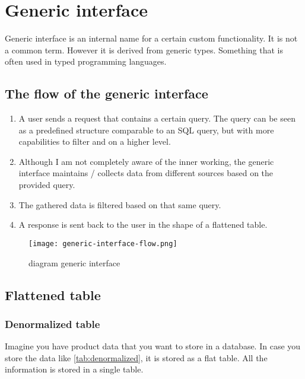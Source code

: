 \chapter{Generic interface}\label{app:generic-interface}

Generic interface is an internal name for a certain custom functionality. It is not a common term. However it is derived from generic types. Something that is often used in typed programming languages.

\section{The flow of the generic interface}
    \begin{enumerate}
        \setlength\itemsep{-2pt} 
        \item{A user sends a request that contains a certain query. The query can be seen as a predefined structure comparable to an SQL query, but with more capabilities to filter and on a higher level.}
        \item{Although I am not completely aware of the inner working, the generic interface maintains / collects data from different sources based on the provided query.}
        \item{The gathered data is filtered based on that same query.}
        \item{A response is sent back to the user in the shape of a flattened table.}
    \end{enumerate}  
     \begin{figure}[H]
        \centering
        \texttt{[image: generic-interface-flow.png]}
        \caption{diagram generic interface}
        \label{fig:diagram-generic-interface}
    \end{figure}
    
\section{Flattened table}

\subsection{Denormalized table}
Imagine you have product data that you want to store in a database. In case you store the data like \autoref{tab:denormalized}, it is stored as a flat table. All the information is stored in a single table.

